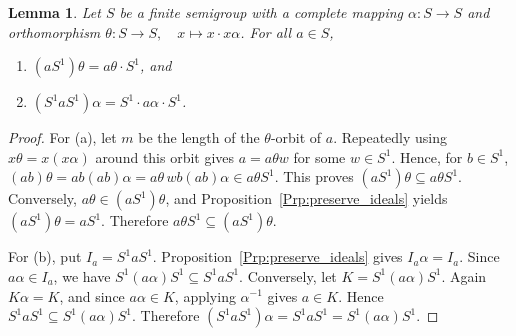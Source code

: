 \documentclass[11pt]{article}
\theoremstyle{plain}
\newtheorem{lemma}[theorem]{Lemma}
\theoremstyle{remark}
\theoremstyle{definition}
\theoremstyle{plain}
\begin{document}
\begin{lemma}\label{Lem:preserve_pideals}
Let $S$ be a finite semigroup with a complete mapping $\alpha\colon S\to S$ and orthomorphism $\theta\colon S\to S,\quad x\mapsto x\cdot x\alpha$. For all $a\in S$,
\begin{enumerate}
    \item $(aS^1)\theta = a\theta\cdot S^1$, and
    \item $(S^1 aS^1)\alpha = S^1\cdot a\alpha\cdot S^1$.
\end{enumerate}
\end{lemma}

\begin{proof}

For (a), let $m$ be the length of the $\theta$-orbit of $a$. Repeatedly using
$x\theta=x(x\alpha)$ around this orbit gives
\(a=a\theta w\)
for some $w\in S^1$. Hence, for $b\in S^1$,
\((ab)\theta=ab(ab)\alpha=a\theta\, w b(ab)\alpha\in a\theta S^1.\)
This proves $(aS^1)\theta\subseteq a\theta S^1$. Conversely,
$a\theta\in (aS^1)\theta$, and Proposition~\ref{Prp:preserve_ideals} yields
$(aS^1)\theta=aS^1$. Therefore
$a\theta S^1\subseteq (aS^1)\theta$.

For (b), put $I_a=S^1aS^1$. Proposition~\ref{Prp:preserve_ideals} gives
$I_a\alpha=I_a$. Since $a\alpha\in I_a$, we have
\(S^1(a\alpha)S^1\subseteq S^1aS^1.\)
Conversely, let $K=S^1(a\alpha)S^1$. Again $K\alpha=K$, and since
$a\alpha\in K$, applying $\alpha^{-1}$ gives $a\in K$. Hence
$S^1aS^1\subseteq S^1(a\alpha)S^1$. Therefore
\((S^1aS^1)\alpha=S^1aS^1=S^1(a\alpha)S^1.\)

\end{proof}
\end{document}
